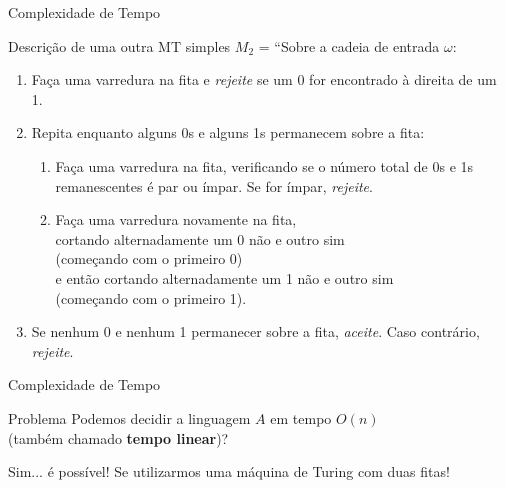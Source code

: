 \documentclass[xcolor=dvipsnames,table]{beamer}
\begin{document}
	\begin{frame}[shrink]{Complexidade de Tempo}
		\begin{block}{Descrição de uma outra MT simples}
			$M_2$ = ``Sobre a cadeia de entrada $\omega$:
			\begin{enumerate}
				\item Faça uma varredura na fita e {\it rejeite} se um 0 for encontrado à direita de um 1.
				\item Repita enquanto alguns 0s e alguns 1s permanecem sobre a fita:
				\begin{enumerate}
					\item Faça uma varredura na fita, verificando se o número total de 0s e 1s remanescentes é par ou ímpar. Se for ímpar, {\it rejeite}.
					\item Faça uma varredura novamente na fita, \\cortando alternadamente um 0 não e outro sim \\(começando com o primeiro 0) \\e então cortando alternadamente um 1 não e outro sim \\(começando com o primeiro 1).
				\end{enumerate}
				\item Se nenhum 0 e nenhum 1 permanecer sobre a fita, {\it aceite}. Caso contrário, {\it rejeite}.
			\end{enumerate}
		\end{block}
	\end{frame}
	
	\begin{frame}{Complexidade de Tempo}
		\begin{block}{Problema}
			Podemos decidir a linguagem $A$ em tempo $O(n)$ \\(também chamado {\bf tempo linear})?
		\end{block}   
		\begin{exampleblock}{Sim... é possível!}
			Se utilizarmos uma máquina de Turing com duas fitas!
		\end{exampleblock}
	\end{frame}
	
\end{document}
